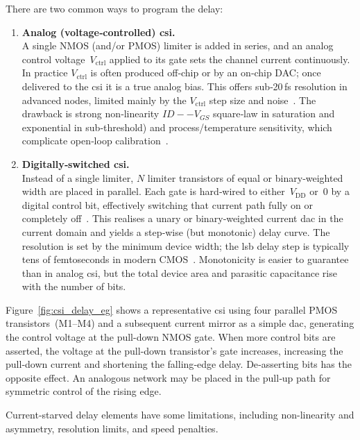 There are two common ways to program the delay:
\begin{enumerate}[label=\alph*]
  \item \textbf{Analog (voltage‑controlled) \gls{csi}.}\\
        A single NMOS (and/or PMOS) limiter is added in series, and an analog control voltage~$V_{\mathrm{ctrl}}$ applied to its gate sets the channel current continuously.  In practice $V_{\mathrm{ctrl}}$ is often produced off‑chip or by an on‑chip DAC; once delivered to the \gls{csi} it is a true analog bias.  This offers sub‑20\,fs resolution in advanced nodes, limited mainly by the $V_{\mathrm{ctrl}}$ step size and noise~\cite{Batur2015high}.  The drawback is strong non‑linearity \(ID--V_{GS}\) square‑law in saturation and exponential in sub‑threshold) and process/temperature sensitivity, which complicate open‑loop calibration~\cite{Seraj2015new}.
  \item \textbf{Digitally‑switched \gls{csi}.}\\
        Instead of a single limiter, $N$ limiter transistors of equal or binary‑weighted width are placed in parallel.  Each gate is hard‑wired to either~$V_{\mathrm{DD}}$ or~0 by a digital control bit, effectively switching that current path fully on or completely off~\cite{maymandi2005monotonic,yao2011}.  This realises a unary or binary‑weighted current \gls{dac} in the current domain and yields a step‑wise (but monotonic) delay curve.  The resolution is set by the minimum device width; the \gls{lsb} delay step is typically tens of femtoseconds in modern CMOS~\cite{Heck2015optimization}.  Monotonicity is easier to guarantee than in analog \gls{csi}, but the total device area and parasitic capacitance rise with the number of bits.
\end{enumerate}

Figure~\ref{fig:csi_delay_eg} shows a representative \gls{csi} using four parallel PMOS transistors~(M1--M4) and a subsequent current mirror as a simple \gls{dac}, generating the control voltage at the pull-down NMOS gate. When more control bits are asserted, the voltage at the pull-down transistor's gate increases, increasing the pull‑down current and shortening the falling‑edge delay. De‑asserting bits has the opposite effect. An analogous network may be placed in the pull‑up path for symmetric control of the rising edge.

Current-starved delay elements have some limitations, including non-linearity and asymmetry, resolution limits, and speed penalties.

